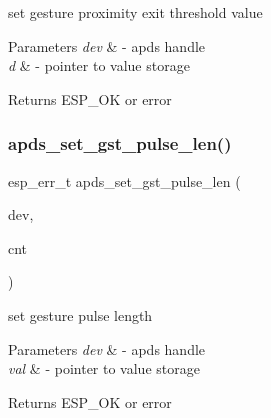 \begin{DoxyItemize}
\item set gesture proximity exit threshold value 
\end{DoxyItemize}


\begin{DoxyParams}{Parameters}
{\em dev} & -\/ apds handle \\
\hline
{\em d} & -\/ pointer to value storage \\
\hline
\end{DoxyParams}
\begin{DoxyReturn}{Returns}
E\+S\+P\+\_\+\+OK or error 
\end{DoxyReturn}
\mbox{\label{group__APDS9960__GestureFunctions_ga4f67cf1ce89086c43c6f40cb2509fc65}} 
\subsubsection{\texorpdfstring{apds\+\_\+set\+\_\+gst\+\_\+pulse\+\_\+len()}{apds\_set\_gst\_pulse\_len()}}
{\footnotesize\ttfamily esp\+\_\+err\+\_\+t apds\+\_\+set\+\_\+gst\+\_\+pulse\+\_\+len (\begin{DoxyParamCaption}\item[{\hyperlink{structAPDS9960__Driver}{A\+P\+D\+S\+\_\+\+D\+EV}}]{dev,  }\item[{\hyperlink{vl53l0x__types_8h_aba7bc1797add20fe3efdf37ced1182c5}{uint8\+\_\+t} $\ast$}]{cnt }\end{DoxyParamCaption})}




\begin{DoxyItemize}
\item set gesture pulse length 
\end{DoxyItemize}


\begin{DoxyParams}{Parameters}
{\em dev} & -\/ apds handle \\
\hline
{\em val} & -\/ pointer to value storage \\
\hline
\end{DoxyParams}
\begin{DoxyReturn}{Returns}
E\+S\+P\+\_\+\+OK or error 
\end{DoxyReturn}
\mbox{\label{group__APDS9960__GestureFunctions_gaae61fea94311fc6d49c6d542b0a5b519}} 
